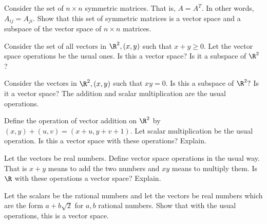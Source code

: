 \begin{enumialphparenastyle}
\begin{ex} Consider the set of $n\times n$ symmetric matrices. That is, $A=A^{T}.$
In other words, $A_{ij}=A_{ji}$. Show that this set of symmetric matrices is
a vector space and a subspace of the vector space of $n\times n$ matrices.
\end{ex}

\begin{ex} Consider the set of all vectors in $\R^{2},\left( x,y\right) $
such that $x+y\geq 0.$ Let the vector space operations be the usual ones. Is
this a vector space? Is it a subspace of $\R^{2}$?
\end{ex}

\begin{ex} Consider the vectors in $\R^{2},\left( x,y\right) $ such that $xy=0$. Is this a subspace of $\R^{2}?$ Is it a vector space? The
addition and scalar multiplication are the usual operations.
\end{ex}

\begin{ex} Define the operation of vector addition on $\R^{2}$ by $\left(
x,y\right) +\left( u,v\right) =\left( x+u,y+v+1\right) .$ Let scalar
multiplication be the usual operation. Is this a vector space with these
operations? Explain.
\end{ex}

\begin{ex} Let the vectors be real numbers. Define vector space operations in the
usual way. That is $x+y$ means to add the two numbers and $xy$ means to
multiply them. Is $\R$ with these operations a vector space? Explain.
\end{ex}

\begin{ex} Let the scalars be the rational numbers and let the vectors be
real numbers which are the form $a+b\sqrt{2}$ for $a,b$ rational numbers.
Show that with the usual operations, this is a vector space.
\end{ex}


\end{enumialphparenastyle}
